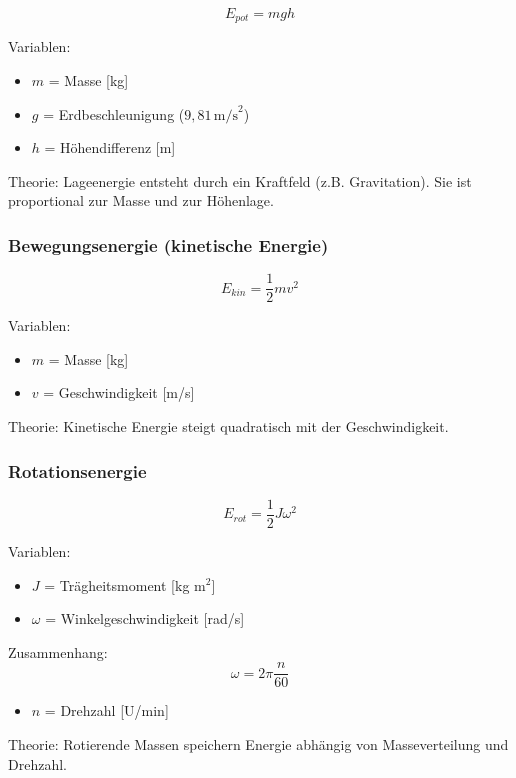 \[
E_{pot} = m g h
\]

Variablen:
\begin{itemize}
\item $m$ = Masse [kg]
\item $g$ = Erdbeschleunigung ($9{,}81\,\text{m/s}^2$)
\item $h$ = Höhendifferenz [m]
\end{itemize}

Theorie:
Lageenergie entsteht durch ein Kraftfeld (z.B. Gravitation).  
Sie ist proportional zur Masse und zur Höhenlage.

\subsubsection{Bewegungsenergie (kinetische Energie)}

\[
E_{kin} = \frac{1}{2} m v^2
\]

Variablen:
\begin{itemize}
\item $m$ = Masse [kg]
\item $v$ = Geschwindigkeit [m/s]
\end{itemize}

Theorie:
Kinetische Energie steigt quadratisch mit der Geschwindigkeit.

\subsubsection{Rotationsenergie}

\[
E_{rot} = \frac{1}{2} J \omega^2
\]

Variablen:
\begin{itemize}
\item $J$ = Trägheitsmoment [kg m$^2$]
\item $\omega$ = Winkelgeschwindigkeit [rad/s]
\end{itemize}

Zusammenhang:
\[
\omega = 2\pi \frac{n}{60}
\]

\begin{itemize}
\item $n$ = Drehzahl [U/min]
\end{itemize}

Theorie:
Rotierende Massen speichern Energie abhängig von Masseverteilung und Drehzahl.

